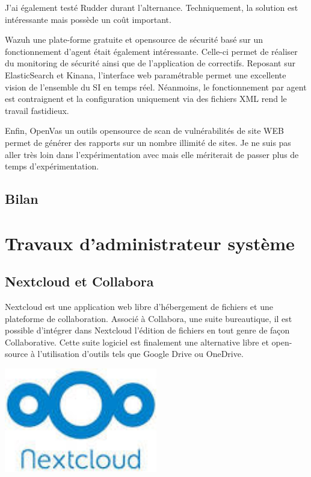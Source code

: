 \documentclass[12pt]{article}
\begin{document}
J'ai également testé Rudder durant l'alternance. Techniquement, la solution est intéressante mais possède un coût important.

Wazuh une plate-forme gratuite et opensource de sécurité basé sur un fonctionnement d'agent était également intéressante. Celle-ci permet de réaliser du monitoring de sécurité ainsi que de l'application de correctifs. Reposant sur ElasticSearch et Kinana, l'interface web paramétrable permet une excellente vision de l'ensemble du SI en temps réel. Néanmoins, le fonctionnement par agent est contraignent et la configuration uniquement via des fichiers XML rend le travail fastidieux.

Enfin, OpenVas un outils opensource de scan de vulnérabilités de site WEB permet de générer des rapports sur un nombre illimité de sites. Je ne suis pas aller très loin dans l'expérimentation avec mais elle mériterait de passer plus de temps d'expérimentation.

\newpage
\subsection{Bilan}


\newpage
\section{Travaux d'administrateur système}
\subsection{Nextcloud et Collabora}
\noindent%
\begin{minipage}{.7\textwidth}%
Nextcloud est une application web libre d'hébergement de fichiers et une plateforme de collaboration. Associé à Collabora, une suite bureautique, il est possible d'intégrer dans Nextcloud l'édition de fichiers en tout genre de façon Collaborative. Cette suite logiciel est finalement une alternative libre et open-source à l'utilisation d'outils tels que Google Drive ou OneDrive.
\end{minipage}%
\hfill
\begin{minipage}{.3\textwidth}%
\begin{center}
\includegraphics[width=0.5\textwidth]{src/nextcloud.jpeg}
\end{center}
\end{minipage}%
\end{document}
